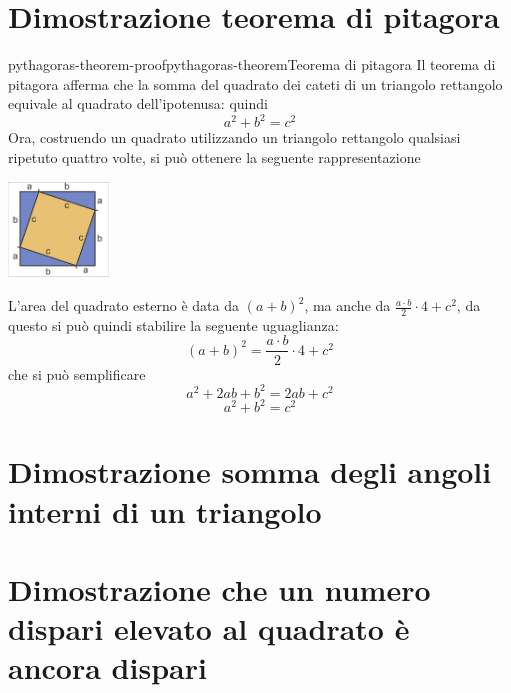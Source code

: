 \documentclass[preview]{standalone}
\begin{document}
\genpage

\section{Dimostrazione teorema di pitagora}

\begin{snippetproof}{pythagoras-theorem-proof}{pythagoras-theorem}{Teorema di pitagora}
    Il teorema di pitagora afferma che la somma del quadrato dei cateti di un triangolo rettangolo
    equivale al quadrato dell'ipotenusa: quindi
    \[
         a^2 + b^2 = c^2
    \]
    Ora, costruendo un quadrato utilizzando un triangolo rettangolo qualsiasi ripetuto quattro volte,
    si può ottenere la seguente rappresentazione

    \vspace{0.5cm}

    \begin{center}
        \includegraphics[width=0.2\textwidth]{resources/pythagorean-theorem-proof.png}
    \end{center}

    \vspace{0.5cm}

    L'area del quadrato esterno è data da \( (a + b)^2 \), ma anche da \( \frac{a \cdot b}{2} \cdot 4 + c^2\), da questo
    si può quindi stabilire la seguente uguaglianza:
    \[ 
       (a + b)^2 = \frac{a \cdot b}{2} \cdot 4 + c^2
    \]
    che si può semplificare
    \[ 
      a^2 + 2ab + b^2 = 2ab + c^2 
    \]
    \[ 
      a^2 + b^2 = c^2
    \]
\end{snippetproof}

\section{Dimostrazione somma degli angoli interni di un triangolo}

\section{Dimostrazione che un numero dispari elevato al quadrato è ancora dispari}
\end{document}
